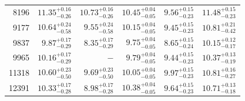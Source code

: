 \begin{table}
\begin{tabular}{|r r r r r r|}
 8196 & $11.35_{-0.26}^{+0.16}$ & $10.73_{-0.26}^{+0.16}$ & $10.45_{-0.05}^{+0.04}$ & $ 9.56_{-0.23}^{+0.15}$ & $11.48_{-0.23}^{+0.15}$ \\
 9177 & $10.64_{-0.58}^{+0.24}$ & $ 9.55_{-0.58}^{+0.24}$ & $10.15_{-0.05}^{+0.04}$ & $ 9.45_{-0.23}^{+0.15}$ & $10.81_{-0.42}^{+0.21}$ \\
 9837 & $ 9.87_{-0.29}^{+0.17}$ & $ 8.35_{-0.29}^{+0.17}$ & $ 9.75_{-0.05}^{+0.04}$ & $ 8.65_{-0.24}^{+0.15}$ & $10.15_{-0.17}^{+0.12}$ \\
 9965 & $10.16_{-0.29}^{+0.17}$ & $    -                $ & $ 9.79_{-0.05}^{+0.04}$ & $ 9.44_{-0.23}^{+0.15}$ & $10.37_{-0.19}^{+0.13}$ \\
11318 & $10.60_{-0.50}^{+0.23}$ & $ 9.69_{-0.50}^{+0.23}$ & $10.05_{-0.05}^{+0.04}$ & $ 9.97_{-0.23}^{+0.15}$ & $10.81_{-0.27}^{+0.16}$ \\
12391 & $10.33_{-0.28}^{+0.17}$ & $ 8.98_{-0.28}^{+0.17}$ & $10.38_{-0.05}^{+0.04}$ & $ 9.64_{-0.23}^{+0.15}$ & $10.71_{-0.18}^{+0.13}$ \\
\hline
\end{tabular}
%
\end{table}
